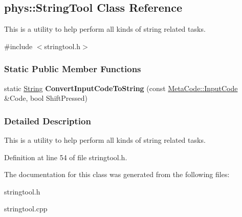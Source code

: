 \hypertarget{classphys_1_1StringTool}{
\subsection{phys::StringTool Class Reference}
\label{d3/d72/classphys_1_1StringTool}
}


This is a utility to help perform all kinds of string related tasks.  




{\ttfamily \#include $<$stringtool.h$>$}

\subsubsection*{Static Public Member Functions}
\begin{DoxyCompactItemize}
\item 
\hypertarget{classphys_1_1StringTool_a775c1f58c263c7489a29c7cc02ab99a4}{
static \hyperlink{namespacephys_aa03900411993de7fbfec4789bc1d392e}{String} {\bfseries ConvertInputCodeToString} (const \hyperlink{classphys_1_1MetaCode_a3e501cbb5bf0f6f1fdb7211465bda8d8}{MetaCode::InputCode} \&Code, bool ShiftPressed)}
\label{d3/d72/classphys_1_1StringTool_a775c1f58c263c7489a29c7cc02ab99a4}

\end{DoxyCompactItemize}


\subsubsection{Detailed Description}
This is a utility to help perform all kinds of string related tasks. 

Definition at line 54 of file stringtool.h.



The documentation for this class was generated from the following files:\begin{DoxyCompactItemize}
\item 
stringtool.h\item 
stringtool.cpp\end{DoxyCompactItemize}

